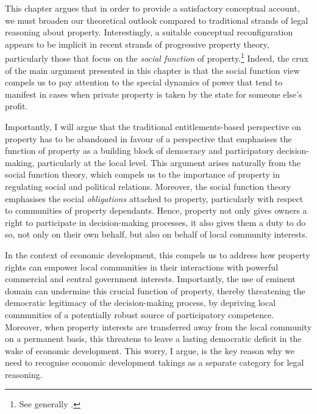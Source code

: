This chapter argues that in order to provide a satisfactory conceptual account, we must broaden our theoretical outlook compared to traditional strands of legal reasoning about property. Interestingly, a suitable conceptual reconfiguration appears to be implicit in recent strands of progressive property theory, particularly those that focus on the {\it social function} of property.\footnote{See generally \cite{alexander09a,foster11,singer00,underkuffler03,alexander06,alexander10,dagan11}.} Indeed, the crux of the main argument presented in this chapter is that the social function view compels us to pay attention to the special dynamics of power that tend to manifest in cases when private property is taken by the state for someone else's profit.

Importantly, I will argue that the traditional entitlements-based perspective on property has to be abandoned in favour of a perspective that emphasises the function of property as a building block of democracy and participatory decision-making, particularly at the local level. This argument arises naturally from the social function theory, which compels us to  the importance of property in regulating social and political relations. Moreover, the social function theory emphasises the social {\it obligations} attached to property, particularly with respect to communities of property dependants. Hence, property not only gives owners a right to participate in decision-making processes, it also gives them a duty to do so, not only on their own behalf, but also on behalf of local community interests.

In the context of economic development, this compels us to address how property rights can empower local communities in their interactions with powerful commercial and central government interests. Importantly, the use of eminent domain can undermine this crucial function of property, thereby threatening the democratic legitimacy of the decision-making process, by depriving local communities of a potentially robust source of participatory competence. Moreover, when property interests are transferred away from the local community on a permanent basis, this threatens to leave a lasting democratic deficit in the wake of economic development. This worry, I argue, is the key reason why we need to recognise economic development takings as a separate category for legal reasoning.

